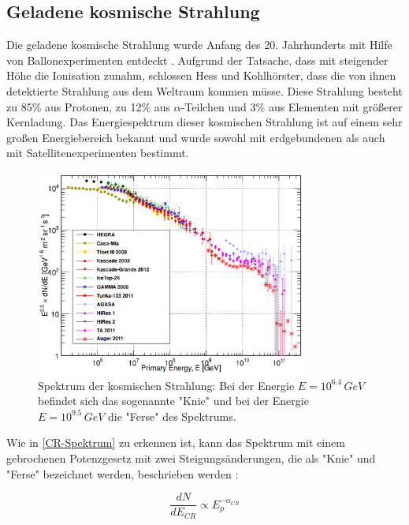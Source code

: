 \subsection{Geladene kosmische Strahlung}
Die geladene kosmische Strahlung wurde Anfang des 20. Jahrhunderts mit Hilfe von Ballonexperimenten entdeckt \cite{Hess}.
Aufgrund der Tatsache, dass mit steigender Höhe die Ionisation zunahm, schlossen Hess und Kohlhörster, dass die von ihnen detektierte Strahlung aus dem Weltraum kommen müsse. \cite{Kohlhoerster}
Diese Strahlung besteht zu 85\% aus Protonen, zu 12\% aus $\alpha$-Teilchen und 3\% aus Elementen mit größerer Kernladung.\cite{Grupen}
Das Energiespektrum dieser kosmischen Strahlung ist auf einem sehr großen Energiebereich bekannt und wurde sowohl mit erdgebundenen als auch mit Satellitenexperimenten bestimmt.


\begin{figure}
    \centering
    \includegraphics[width=0.8\textwidth]{./Plots/02_Astroteilchenphysik/CosmicRaySpectrum.png}
    \caption{Spektrum der kosmischen Strahlung: Bei der Energie $E=10^{6.4}\,\si{GeV}$ befindet sich das sogenannte "Knie" und bei der Energie $E=10^{9.5}\,\si{GeV}$ die "Ferse" des Spektrums. \cite{GaisserSpektrum}}
    \label{CR-Spektrum}
\end{figure}



Wie in \autoref{CR-Spektrum} zu erkennen ist, kann das Spektrum mit einem gebrochenen Potenzgesetz mit zwei Steigungsänderungen, die als "Knie" und "Ferse" bezeichnet werden, beschrieben werden \cite{DissBecker}:

\begin{equation}
 \frac{dN}{dE_{CR}} \propto E_p^{-\alpha_{CR}}
\end{equation}

